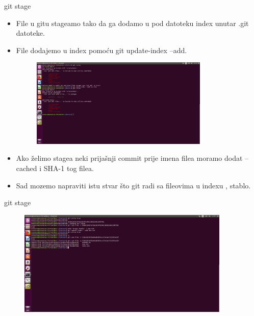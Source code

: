 \documentclass{beamer}
\begin{document}
\begin{frame}{git stage}

\begin{itemize}
	\item File u gitu stageamo tako da ga dodamo u pod datoteku index unutar .git datoteke.
	\item File dodajemo u index pomoću git update-index --add.
	\begin{figure}
		\centering
	\includegraphics[width=0.8\textwidth]{./slike/cetvrta_slika.png}
	\end{figure}
	\item Ako želimo stagea neki prijašnji commit prije imena filea moramo dodat --cached i SHA-1 tog filea.
	\item Sad mozemo napraviti istu stvar što git radi sa fileovima u indexu , stablo.
	
		
\end{itemize}


\end{frame}
\begin{frame}{git stage}
	\begin{figure}
		\centering
	\includegraphics[width=0.9\textwidth]{./slike/peta_slika.png}
	\end{figure}
\end{frame}
\end{document}
